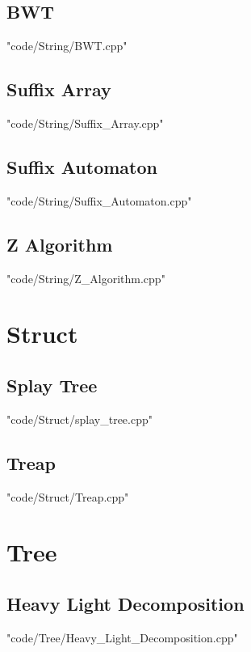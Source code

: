 \documentclass [landscape,8pt,a4paper,twocolumn]{article}
\begin{document}
\subsection{BWT}
 {"code/String/BWT.cpp"}
\subsection{Suffix Array}
 {"code/String/Suffix_Array.cpp"}
\subsection{Suffix Automaton}
 {"code/String/Suffix_Automaton.cpp"}
\subsection{Z Algorithm}
 {"code/String/Z_Algorithm.cpp"}
\section{Struct}
\subsection{Splay Tree}
 {"code/Struct/splay_tree.cpp"}
\subsection{Treap}
 {"code/Struct/Treap.cpp"}
\section{Tree}
\subsection{Heavy Light Decomposition}
 {"code/Tree/Heavy_Light_Decomposition.cpp"}
\end{document}

